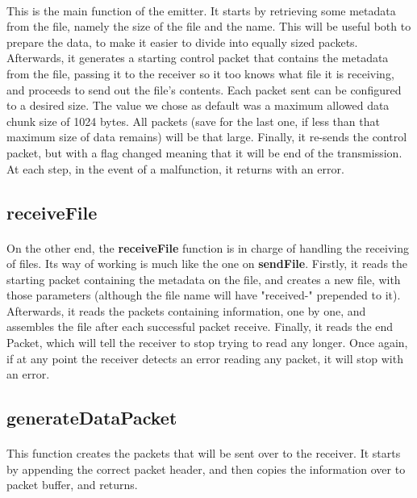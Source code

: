 \documentclass[11pt]{article}
\begin{document}
\paragraph{}This is the main function of the emitter. It starts by retrieving some metadata from the file, namely the size of the file and the name. This will be useful both to prepare the data, to make it easier to divide into equally sized packets. Afterwards, it generates a starting control packet that contains the metadata from the file, passing it to the receiver so it too knows what file it is receiving, and proceeds to send out the file's contents. Each packet
sent can be configured to a desired size. The value we chose as default was a maximum allowed data chunk size of 1024 bytes. All packets (save for the last one, if less than that maximum size of data remains) will be that large. Finally, it re-sends the control packet, but with a flag changed meaning that it will be end of the transmission. At each step, in the event of a malfunction, it returns
with an error.

\subsection*{receiveFile}

\paragraph{}On the other end, the \textbf{receiveFile} function is in charge of handling the receiving of files. Its
way of working is much like the one on \textbf{sendFile}. Firstly, it reads the starting packet containing
the metadata on the file, and creates a new file, with those parameters (although the file name will have "received-" prepended to it). Afterwards, it reads the packets containing information, one by one, and assembles the file after
each successful packet receive. Finally, it reads the end Packet, which will tell the receiver to stop trying to read any longer. Once again, if at any point the receiver detects an error reading any packet, it will stop with an error.

\subsection*{generateDataPacket}

\paragraph{}This function creates the packets that will be sent over to the receiver. It starts by appending
the correct packet header, and then copies the information over to packet buffer, and returns.
\end{document}
